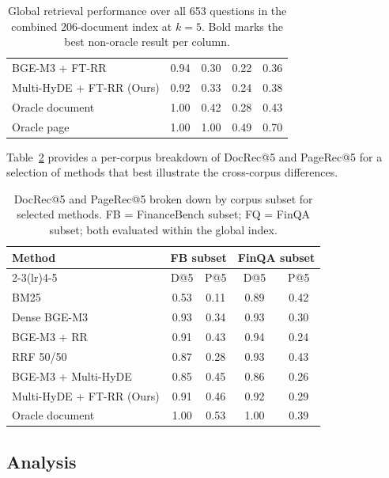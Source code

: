 \documentclass[12pt,twoside,maitrise]{dms}
\theoremstyle{definition}
\numberwithin{equation}{section}
\numberwithin{table}{chapter}
\numberwithin{figure}{chapter}
\begin{document}
\begin{table}[ht]
\begin{tabularx}{\textwidth}{Xcccc}
BGE-M3 + FT-RR             & 0.94 & 0.30 & 0.22 & 0.36 \\
Multi-HyDE + FT-RR (Ours)  & 0.92 & 0.33 & 0.24 & 0.38 \\
\midrule
Oracle document            & 1.00 & 0.42 & 0.28 & 0.43 \\
Oracle page                & 1.00 & 1.00 & 0.49 & 0.70 \\
\bottomrule
\end{tabularx}
\caption{Global retrieval performance over all 653 questions in the combined
  206-document index at $k=5$. Bold marks the best non-oracle result per column.}
\label{tab:ext_global}
\end{table}

Table~\ref{tab:ext_breakdown} provides a per-corpus breakdown of DocRec@5 and PageRec@5
for a selection of methods that best illustrate the cross-corpus differences. 

\begin{table}[ht]
\centering

\small
\begin{tabular}{lcccc}
\toprule
\multirow{2}{*}{\textbf{Method}}
  & \multicolumn{2}{c}{\textbf{FB subset}}
  & \multicolumn{2}{c}{\textbf{FinQA subset}} \\
\cmidrule(lr){2-3}\cmidrule(lr){4-5}
  & D@5 & P@5 & D@5 & P@5 \\
\midrule
BM25                      & 0.53 & 0.11 & 0.89 & 0.42 \\
Dense BGE-M3              & 0.93 & 0.34 & 0.93 & 0.30 \\
BGE-M3 + RR               & 0.91 & 0.43 & 0.94 & 0.24 \\
RRF 50/50                 & 0.87 & 0.28 & 0.93 & 0.43 \\
BGE-M3 + Multi-HyDE       & 0.85 & 0.45 & 0.86 & 0.26 \\
Multi-HyDE + FT-RR (Ours) & 0.91 & 0.46 & 0.92 & 0.29 \\
\midrule
Oracle document           & 1.00 & 0.53 & 1.00 & 0.39 \\
\bottomrule
\end{tabular}
\caption{DocRec@5 and PageRec@5 broken down by corpus subset for selected methods.
  FB = FinanceBench subset; FQ = FinQA subset; both evaluated within the global index.}
\label{tab:ext_breakdown}
\end{table}

\subsection{Analysis}
\label{sec:extension_analysis}
\end{document}
